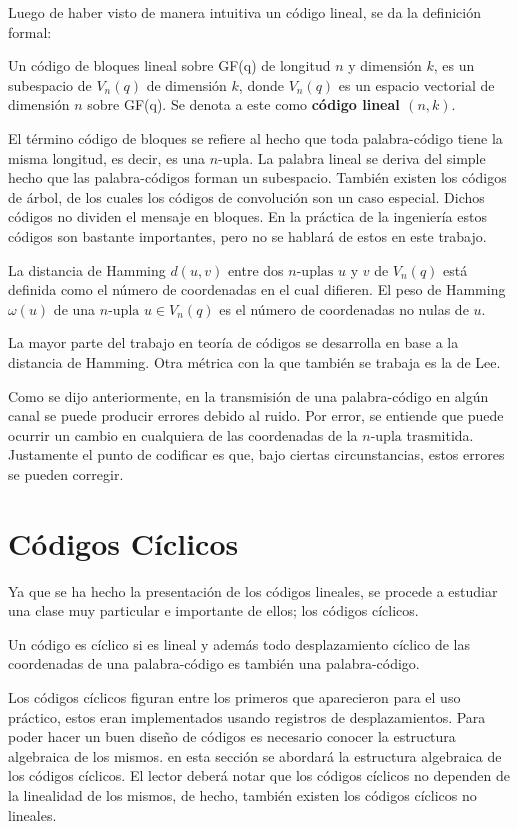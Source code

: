 Luego de haber visto de manera intuitiva un código lineal, se da la definición formal:
\begin{definicion}
Un código de bloques lineal sobre GF(q) de longitud $n$ y dimensión $k$, es un subespacio de $V_n(q)$ de dimensión $k$, donde $V_n(q)$ es un espacio vectorial de dimensión $n$ sobre GF(q). Se denota a este como \textbf{código lineal $(n,k)$}.
\end{definicion}
El término código de bloques se refiere al hecho que toda palabra-código tiene la misma longitud, es decir, es una $n\mbox{-upla}$. La palabra lineal se deriva del simple hecho que las palabra-códigos forman un subespacio. 
También existen los códigos de árbol, de los cuales los códigos de convolución son un caso especial. Dichos códigos no dividen el mensaje en bloques. En la práctica de la ingeniería estos códigos son bastante importantes, pero no se hablará de estos en este trabajo.
\begin{definicion}
La distancia de Hamming $d(u,v)$ entre dos $n\mbox{-uplas}$ $u$ y $v$ de $V_n(q)$ está definida como el número de coordenadas en el cual difieren. El peso de Hamming $\omega(u)$ de una $n\mbox{-upla } u \in V_n(q)$ es el número de coordenadas no nulas de $u$.
\end{definicion}
La mayor parte del trabajo en teoría de códigos se desarrolla en base a la distancia de Hamming. Otra métrica con la que también se trabaja es la de Lee.

Como se dijo anteriormente, en la transmisión de una palabra-código en algún canal se puede producir errores debido al ruido. Por error, se entiende que puede ocurrir un cambio en cualquiera de las coordenadas de la $n\mbox{-upla}$ trasmitida. Justamente el punto de codificar es que, bajo ciertas circunstancias, estos errores se pueden corregir.

\section{\quad Códigos Cíclicos} 

Ya que se ha hecho la presentación de los códigos lineales, se procede a estudiar una clase muy particular e importante de ellos; los códigos cíclicos.

\begin{definicion}
Un código es cíclico si es lineal y además todo desplazamiento cíclico de las coordenadas de una palabra-código es también una palabra-código. 
\end{definicion}
Los códigos cíclicos figuran entre los primeros que aparecieron para el uso práctico, estos eran implementados usando registros de desplazamientos. 
Para poder hacer un buen diseño de códigos es necesario conocer la estructura algebraica de los mismos. en esta sección se abordará la estructura algebraica de los códigos cíclicos.
El lector deberá notar que los códigos cíclicos no dependen de la linealidad de los mismos, de hecho, también existen los códigos cíclicos no lineales.

